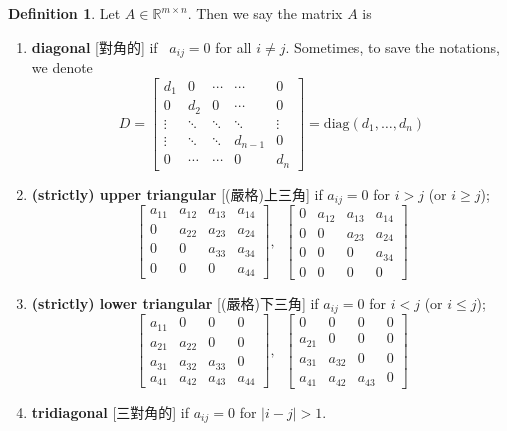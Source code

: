 \documentclass{article}
\theoremstyle{definition}
\newtheorem{definition}{Definition}[section]
\numberwithin{theorem}{section}
\numberwithin{equation}{section}
\begin{document}
\begin{definition}
    Let $A \in \mathbb{R}^{m \times n}$. Then we say the matrix $A$ is
    \begin{enumerate}
\item \textbf{diagonal} [對角的] if ~$a_{ij} = 0$ for all $i \neq j$. Sometimes, to save the notations, we denote
  \[
    D =\begin{bmatrix} d_1 &0 &\cdots &\cdots  &0 \\ 0 &d_2 & 0 &\cdots &0\\ \vdots &\ddots &\ddots &\ddots &\vdots \\ \vdots &\ddots &\ddots & d_{n-1} & 0\\ 0 &\cdots &\cdots & 0 & d_n  \end{bmatrix}= \text{diag}(d_1, \ldots, d_n)
   \]
\item \textbf{(strictly) upper triangular} [(嚴格)上三角] if $a_{ij} = 0$ for $i > j$ (or $i \geq j$);
  \[
   \begin{bmatrix}
   a_{11} & a_{12} & a_{13} & a_{14} \\
   0 & a_{22} & a_{23} & a_{24} \\
   0 & 0 & a_{33} & a_{34} \\
   0 & 0 & 0 & a_{44}
   \end{bmatrix}, \;\;
   \begin{bmatrix}
   0 & a_{12} & a_{13} & a_{14} \\
   0 & 0 & a_{23} & a_{24} \\
   0 & 0 & 0 & a_{34} \\
   0 & 0 & 0 & 0
   \end{bmatrix}
   \]
\item \textbf{(strictly) lower triangular} [(嚴格)下三角] if  $a_{ij} = 0$ for $i < j$ (or $i \leq j$);
  \[
   \begin{bmatrix}
   a_{11} & 0 & 0 & 0 \\
   a_{21} & a_{22} & 0 & 0 \\
   a_{31} & a_{32} & a_{33} & 0 \\
   a_{41} & a_{42} & a_{43} & a_{44}
   \end{bmatrix},\;\;
   \begin{bmatrix}
   0 & 0 & 0 & 0 \\
   a_{21} & 0 & 0 & 0 \\
   a_{31} & a_{32} & 0 & 0 \\
   a_{41} & a_{42} & a_{43} & 0
   \end{bmatrix}
   \]
\item \textbf{tridiagonal} [三對角的] if $a_{ij} = 0$ for $|i-j| > 1$.

\end{enumerate}
\end{definition}
\end{document}
